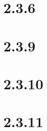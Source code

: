 \documentclass[12pt]{article}
\begin{document}
\section*{2.3.6}
\section*{2.3.9}
\section*{2.3.10}
\section*{2.3.11}
\end{document}
